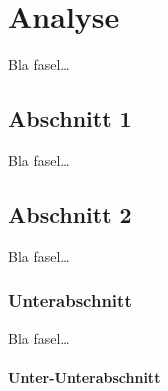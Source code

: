 
\chapter{Analyse}
\label{ch:Analyse}
Bla fasel\ldots

\section{Abschnitt 1}
\label{ch:Analyse:sec:Abschnitt1}

Bla fasel\ldots

\section{Abschnitt 2}
\label{ch:Analyse:sec:Abschnitt2}
Bla fasel\ldots
\subsection{Unterabschnitt}
Bla fasel\ldots
\subsubsection{Unter-Unterabschnitt}

